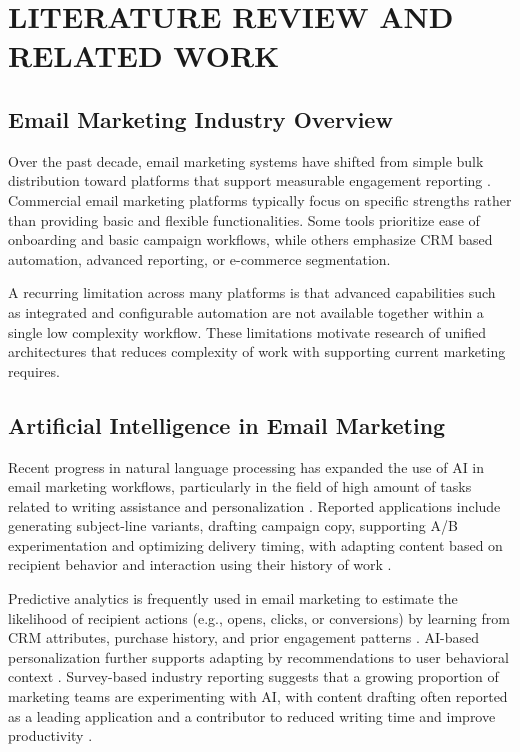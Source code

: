 \documentclass[12pt,journal,compsoc]{IEEEtran}
\begin{document}
\section{LITERATURE REVIEW AND RELATED WORK}

\subsection{Email Marketing Industry Overview}
Over the past decade, email marketing systems have shifted from simple bulk distribution toward platforms that support measurable engagement reporting \cite{ref1,ref2}. Commercial email marketing platforms typically focus on specific strengths rather than providing basic and flexible functionalities. Some tools prioritize ease of onboarding and basic campaign workflows, while others emphasize CRM based automation, advanced reporting, or e-commerce segmentation.

A recurring limitation across many platforms is that advanced capabilities such as integrated and configurable automation are not available together within a single low complexity workflow. These limitations motivate research of unified architectures that reduces complexity of work with supporting current marketing requires.

\subsection{Artificial Intelligence in Email Marketing}
Recent progress in natural language processing has expanded the use of AI in email marketing workflows, particularly in the field of high amount of tasks related to writing assistance and personalization \cite{ref4,ref6}. Reported applications include generating subject-line variants, drafting campaign copy, supporting A/B experimentation and optimizing delivery timing, with adapting content based on recipient behavior and interaction using their history of work \cite{ref7,ref8}.

Predictive analytics is frequently used in email marketing to estimate the likelihood of recipient actions (e.g., opens, clicks, or conversions) by learning from CRM attributes, purchase history, and prior engagement patterns \cite{ref9,ref10}. AI-based personalization further supports adapting by recommendations to user behavioral context \cite{ref11}. Survey-based industry reporting suggests that a growing proportion of marketing teams are experimenting with AI, with content drafting often reported as a leading application and a contributor to reduced writing time and improve productivity \cite{ref12}.
\end{document}
